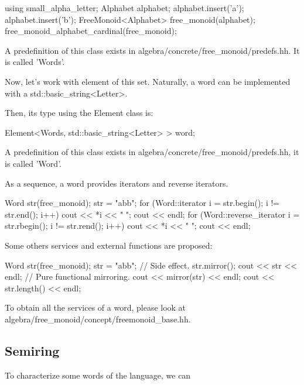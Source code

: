 \documentclass{article}
\begin{document}
\begin{code}
\begin{code}
{
  using small_alpha_letter;
  Alphabet     alphabet;
  alphabet.insert('a');
  alphabet.insert('b');
  FreeMonoid<Alphabet> free_monoid(alphabet);
  free_monoid_alphabet_cardinal(free_monoid);
}
\end{code}

A predefinition of this class exists in
algebra/concrete/free\_monoid/predefs.hh. It is called 'Words'.

Now, let's work with element of this set. Naturally, a word can be
implemented with a std::basic\_string<Letter>.

Then, its type using the Element class is:

\begin{code}
{
  Element<Words, std::basic_string<Letter> > word;
}
\end{code}

A predefinition of this class exists in
algebra/concrete/free\_monoid/predefs.hh, it is called 'Word'.

As a sequence, a word provides iterators and reverse iterators. 

\begin{code}
  Word str(free_monoid);
  str = "abb";
  for (Word::iterator i = str.begin(); i != str.end(); i++)
    cout << *i << " ";
  cout << endl;
  for (Word::reverse_iterator i = str.rbegin(); i != str.rend(); i++)
    cout << *i << " ";
  cout << endl;
\end{code}

Some others services and external functions are proposed:

\begin{code}
  Word str(free_monoid);
  str = "abb";
  // Side effect.
  str.mirror();
  cout << str << endl;
  // Pure functional mirroring.
  cout << mirror(str) << endl;
  cout << str.length() << endl;
\end{code}

To obtain all the services of a word, please look at
algebra/free\_monoid/concept/freemonoid\_base.hh.

\subsection{Semiring}

To characterize some words of the language, we can 


\end{code}
\end{document}
